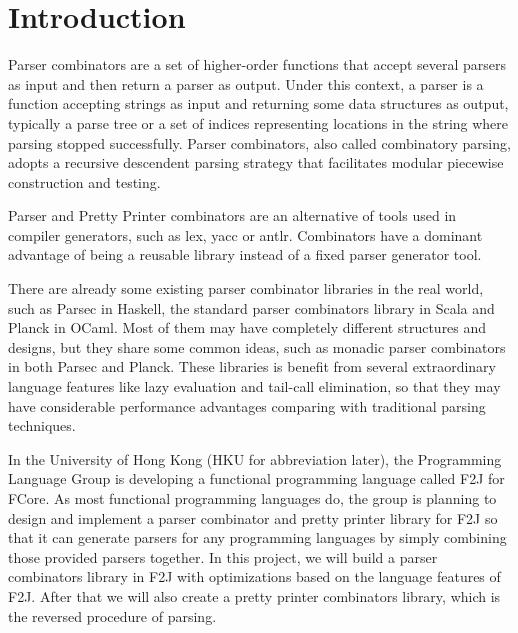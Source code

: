 \chapter{Introduction}

Parser combinators are a set of higher-order functions that accept several parsers as input and then return a parser as output. Under this context, a parser is a function accepting strings as input and returning some data structures as output, typically a parse tree or a set of indices representing locations in the string where parsing stopped successfully. Parser combinators, also called combinatory parsing, adopts a recursive descendent parsing strategy that facilitates modular piecewise construction and testing.

Parser and Pretty Printer combinators are an alternative of tools used in compiler generators, such as lex, yacc or antlr. Combinators have a dominant advantage of being a reusable library instead of a fixed parser generator tool.

There are already some existing parser combinator libraries in the real world, such as Parsec \cite{Leijen:2002} in Haskell, the standard parser combinators library in Scala and Planck \cite{Planck} in OCaml. Most of them may have completely different structures and designs, but they share some common ideas, such as monadic parser combinators in both Parsec and Planck. These libraries is benefit from several extraordinary language features like lazy evaluation and tail-call elimination, so that they may have considerable performance advantages comparing with traditional parsing techniques.

In the University of Hong Kong (HKU for abbreviation later), the Programming Language Group is developing a functional programming language called F2J for FCore. As most functional programming languages do, the group is planning to design and implement a parser combinator and pretty printer library for F2J so that it can generate parsers for any programming languages by simply combining those provided parsers together. In this project, we will build a parser combinators library in F2J with optimizations based on the language features of F2J. After that we will also create a pretty printer combinators library, which is the reversed procedure of parsing.
